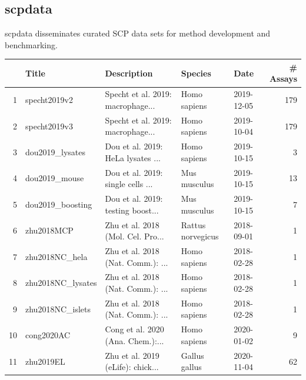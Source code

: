 \documentclass{article}
\newcommand{\hcode}[2][lgray]{{\ttfamily\color{vdgray}\colorbox{#1}{#2}}}
\begin{document}
\begin{multicols}{2}
\begin{minipage}[t]{\linewidth}
\end{minipage}


\noindent
\begin{minipage}[t]{\linewidth}
  \vspace{0.55cm}
  \section*{\huge \hcode{scpdata}}
  
  \hcode{scpdata} disseminates curated SCP data sets for method 
  development and benchmarking.
  \vspace{0.1cm}
  
    \centering
    \scriptsize
    \begin{tabular}{rllllr}
      \hline
     & Title & Description & Species & Date & \# Assays \\ 
      \hline
    1 & specht2019v2 & Specht et al. 2019: macrophage... & Homo sapiens & 2019-12-05 & 179 \\ 
      2 & specht2019v3 & Specht et al. 2019: macrophage... & Homo sapiens & 2019-10-04 & 179 \\ 
      3 & dou2019\_lysates & Dou et al. 2019: HeLa lysates
    ... & Homo sapiens & 2019-10-15 &   3 \\ 
      4 & dou2019\_mouse & Dou et al. 2019: single cells ... & Mus musculus & 2019-10-15 &  13 \\ 
      5 & dou2019\_boosting & Dou et al. 2019: testing boost... & Mus musculus & 2019-10-15 &   7 \\ 
      6 & zhu2018MCP & Zhu et al. 2018 (Mol. Cel. Pro... & Rattus norvegicus & 2018-09-01 &   1 \\ 
      7 & zhu2018NC\_hela & Zhu et al. 2018 (Nat. Comm.): ... & Homo sapiens & 2018-02-28 &   1 \\ 
      8 & zhu2018NC\_lysates & Zhu et al. 2018 (Nat. Comm.): ... & Homo sapiens & 2018-02-28 &   1 \\ 
      9 & zhu2018NC\_islets & Zhu et al. 2018 (Nat. Comm.): ... & Homo sapiens & 2018-02-28 &   1 \\ 
      10 & cong2020AC & Cong et al. 2020 (Ana. Chem.):... & Homo sapiens & 2020-01-02 &   9 \\ 
      11 & zhu2019EL & Zhu et al. 2019 (eLife): chick... & Gallus gallus & 2020-11-04 &  62 \\ 
       \hline
    \end{tabular}
\end{minipage}



\end{multicols}
\end{document}

